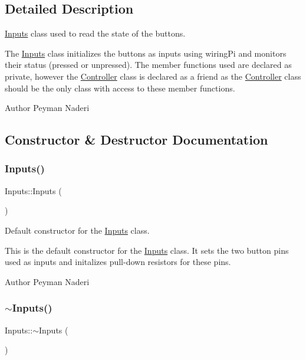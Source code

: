 \subsection{Detailed Description}
\hyperlink{classInputs}{Inputs} class used to read the state of the buttons. 

The \hyperlink{classInputs}{Inputs} class initializes the buttons as inputs using wiring\+Pi and monitors their status (pressed or unpressed). The member functions used are declared as private, however the \hyperlink{classController}{Controller} class is declared as a friend as the \hyperlink{classController}{Controller} class should be the only class with access to these member functions.

\begin{DoxyAuthor}{Author}
Peyman Naderi 
\end{DoxyAuthor}


\subsection{Constructor \& Destructor Documentation}
\mbox{\label{classInputs_abd859d2c8a001153eb26aeeac263ed3d}} 
\subsubsection{\texorpdfstring{Inputs()}{Inputs()}}
{\footnotesize\ttfamily Inputs\+::\+Inputs (\begin{DoxyParamCaption}{ }\end{DoxyParamCaption})\hspace{0.3cm}{\ttfamily [private]}}



Default constructor for the \hyperlink{classInputs}{Inputs} class. 

This is the default constructor for the \hyperlink{classInputs}{Inputs} class. It sets the two button pins used as inputs and initalizes pull-\/down resistors for these pins.

\begin{DoxyAuthor}{Author}
Peyman Naderi 
\end{DoxyAuthor}
\mbox{\label{classInputs_a721935d4549a704e944c056227214ca5}} 
\subsubsection{\texorpdfstring{$\sim$\+Inputs()}{~Inputs()}}
{\footnotesize\ttfamily Inputs\+::$\sim$\+Inputs (\begin{DoxyParamCaption}{ }\end{DoxyParamCaption})\hspace{0.3cm}{\ttfamily [private]}}



